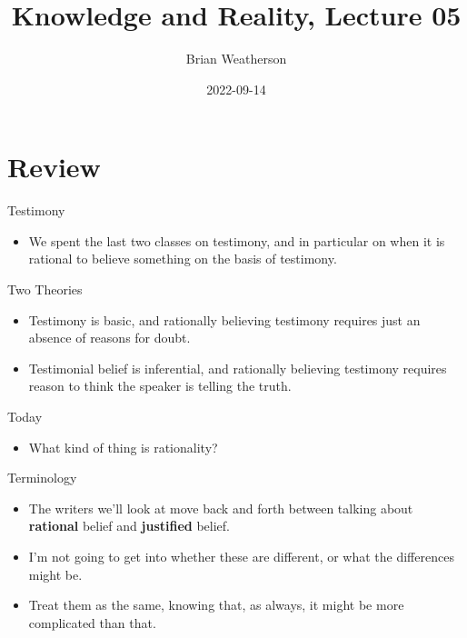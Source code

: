 \documentclass[
  17pt,
  letterpaper,
  ignorenonframetext,
  aspectratio=169,
]{beamer}
\title{Knowledge and Reality, Lecture 05}
\author{Brian Weatherson}
\date{2022-09-14}
\providecommand{\tightlist}{%
  \setlength{\itemsep}{0pt}\setlength{\parskip}{0pt}}\usepackage{longtable,booktabs,array}
\begin{document}
\frame{\titlepage}
\ifdefined\Shaded\renewenvironment{Shaded}{\begin{tcolorbox}[borderline west={3pt}{0pt}{shadecolor}, enhanced, frame hidden, interior hidden, sharp corners, breakable, boxrule=0pt]}{\end{tcolorbox}}\fi

\hypertarget{review}{%
\section{Review}\label{review}}

\begin{frame}{Testimony}
\protect\hypertarget{testimony}{}
\begin{itemize}[<+->]
\tightlist
\item
  We spent the last two classes on testimony, and in particular on when
  it is rational to believe something on the basis of testimony.
\end{itemize}
\end{frame}

\begin{frame}{Two Theories}
\protect\hypertarget{two-theories}{}
\begin{itemize}[<+->]
\tightlist
\item
  Testimony is basic, and rationally believing testimony requires just
  an absence of reasons for doubt.
\item
  Testimonial belief is inferential, and rationally believing testimony
  requires reason to think the speaker is telling the truth.
\end{itemize}
\end{frame}

\begin{frame}{Today}
\protect\hypertarget{today}{}
\begin{itemize}[<+->]
\tightlist
\item
  What kind of thing is rationality?
\end{itemize}
\end{frame}

\begin{frame}{Terminology}
\protect\hypertarget{terminology}{}
\begin{itemize}[<+->]
\tightlist
\item
  The writers we'll look at move back and forth between talking about
  \textbf{rational} belief and \textbf{justified} belief.
\item
  I'm not going to get into whether these are different, or what the
  differences might be.
\item
  Treat them as the same, knowing that, as always, it might be more
  complicated than that.
\end{itemize}
\end{frame}
\end{document}
